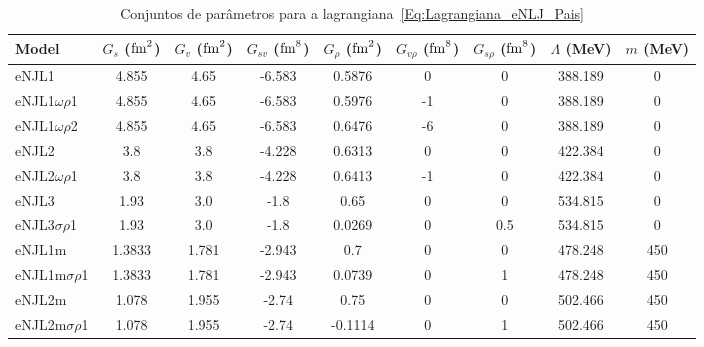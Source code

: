 \begin{table*}
\begin{tabular}{lcccccccc}
\toprule
Model & $G_s$ ($\rm{fm}^2$) & $G_v$ ($\rm{fm}^2$) & $G_{sv}$ ($\rm{fm}^8$) & $G_\rho$ ($\rm{fm}^2$) & $G_{v\rho}$ ($\rm{fm}^8$) & $G_{s\rho}$ ($\rm{fm}^8$) & $\Lambda$ (MeV) & $m$ (MeV) \\
\midrule
eNJL1 & 4.855 & 4.65 & -6.583 & 0.5876 & 0 & 0 & 388.189 & 0 \\
eNJL1$\omega\rho$1 & 4.855 & 4.65 & -6.583 & 0.5976 & -1 & 0 & 388.189 & 0 \\
eNJL1$\omega\rho$2 & 4.855 & 4.65 & -6.583 & 0.6476 & -6 & 0 & 388.189 & 0 \\
eNJL2 & 3.8 & 3.8 & -4.228 & 0.6313 & 0 & 0 & 422.384 & 0 \\
eNJL2$\omega\rho$1 & 3.8 & 3.8 & -4.228 & 0.6413 & -1 & 0 & 422.384 & 0 \\
eNJL3 & 1.93 & 3.0 & -1.8 & 0.65 & 0 & 0 & 534.815 & 0 \\
eNJL3$\sigma\rho$1 & 1.93 & 3.0 & -1.8 & 0.0269 & 0 & 0.5 & 534.815 & 0 \\
eNJL1m & 1.3833 & 1.781 & -2.943 & 0.7 & 0 & 0 & 478.248 & 450 \\
eNJL1m$\sigma\rho$1 & 1.3833 & 1.781 & -2.943 & 0.0739 & 0 & 1 & 478.248 & 450 \\
eNJL2m & 1.078 & 1.955 & -2.74 & 0.75 & 0 & 0 & 502.466 & 450 \\
eNJL2m$\sigma\rho$1 & 1.078 & 1.955 & -2.74 & -0.1114 & 0 & 1 & 502.466 & 450 \\
\bottomrule
\end{tabular}
\caption{Conjuntos de parâmetros para a lagrangiana~\eqref{Eq:Lagrangiana_eNLJ_Pais}}
\end{table*}

